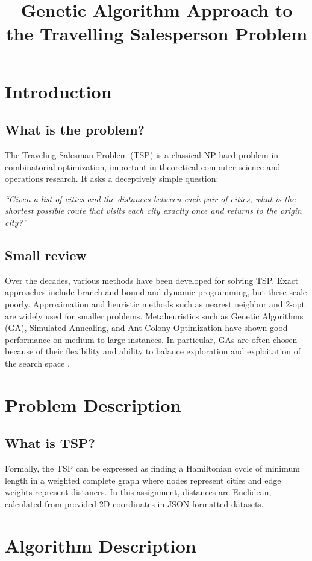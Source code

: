 \documentclass[conference]{IEEEtran}
\title{Genetic Algorithm Approach to the Travelling Salesperson Problem}
\author{
    \IEEEauthorblockN{Ignat Bojinov}
    \IEEEauthorblockA{University Name \\
    ignat@example.com}
}
\begin{document}
\maketitle

\section{Introduction}
\subsection{What is the problem?}
The Traveling Salesman Problem (TSP) is a classical NP-hard problem in combinatorial optimization, important in theoretical computer science and operations research. It asks a deceptively simple question: 

\emph{``Given a list of cities and the distances between each pair of cities, what is the shortest possible route that visits each city exactly once and returns to the origin city?''}

\subsection{Small review}
Over the decades, various methods have been developed for solving TSP. Exact approaches include branch-and-bound and dynamic programming, but these scale poorly. Approximation and heuristic methods such as nearest neighbor and 2-opt are widely used for smaller problems. Metaheuristics such as Genetic Algorithms (GA), Simulated Annealing, and Ant Colony Optimization have shown good performance on medium to large instances. In particular, GAs are often chosen because of their flexibility and ability to balance exploration and exploitation of the search space \cite{wikiTSP}.

\section{Problem Description}
\subsection{What is TSP?}
Formally, the TSP can be expressed as finding a Hamiltonian cycle of minimum length in a weighted complete graph where nodes represent cities and edge weights represent distances. In this assignment, distances are Euclidean, calculated from provided 2D coordinates in JSON-formatted datasets.

\section{Algorithm Description}
\end{document}
